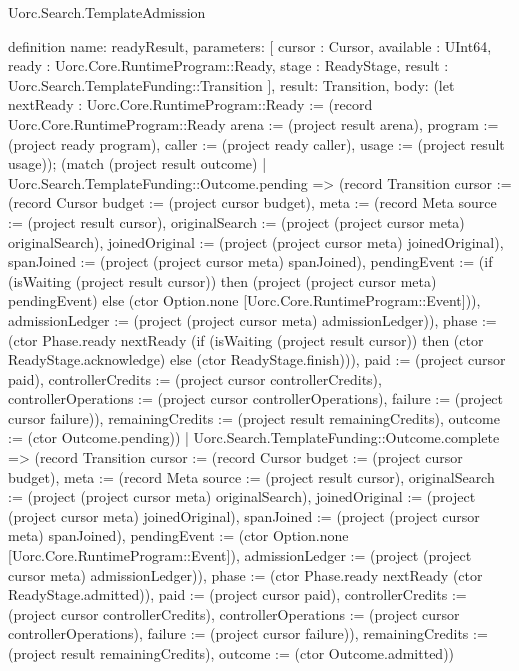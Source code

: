 \begin{lexlean}{Uorc.Search.TemplateAdmission}
\begin{semanticmodule}
definition{
  name: readyResult,
  parameters: [
    cursor : Cursor,
    available : UInt64,
    ready : Uorc.Core.RuntimeProgram::Ready,
    stage : ReadyStage,
    result : Uorc.Search.TemplateFunding::Transition
  ],
  result: Transition,
  body: (let nextReady : Uorc.Core.RuntimeProgram::Ready := (record Uorc.Core.RuntimeProgram::Ready {arena := (project result arena), program := (project ready program), caller := (project ready caller), usage := (project result usage)}); (match (project result outcome)
    | Uorc.Search.TemplateFunding::Outcome.pending => (record Transition {cursor := (record Cursor {budget := (project cursor budget), meta := (record Meta {source := (project result cursor), originalSearch := (project (project cursor meta) originalSearch), joinedOriginal := (project (project cursor meta) joinedOriginal), spanJoined := (project (project cursor meta) spanJoined), pendingEvent := (if (isWaiting (project result cursor)) then (project (project cursor meta) pendingEvent) else (ctor Option.none [Uorc.Core.RuntimeProgram::Event])), admissionLedger := (project (project cursor meta) admissionLedger)}), phase := (ctor Phase.ready nextReady (if (isWaiting (project result cursor)) then (ctor ReadyStage.acknowledge) else (ctor ReadyStage.finish))), paid := (project cursor paid), controllerCredits := (project cursor controllerCredits), controllerOperations := (project cursor controllerOperations), failure := (project cursor failure)}), remainingCredits := (project result remainingCredits), outcome := (ctor Outcome.pending)})
    | Uorc.Search.TemplateFunding::Outcome.complete => (record Transition {cursor := (record Cursor {budget := (project cursor budget), meta := (record Meta {source := (project result cursor), originalSearch := (project (project cursor meta) originalSearch), joinedOriginal := (project (project cursor meta) joinedOriginal), spanJoined := (project (project cursor meta) spanJoined), pendingEvent := (ctor Option.none [Uorc.Core.RuntimeProgram::Event]), admissionLedger := (project (project cursor meta) admissionLedger)}), phase := (ctor Phase.ready nextReady (ctor ReadyStage.admitted)), paid := (project cursor paid), controllerCredits := (project cursor controllerCredits), controllerOperations := (project cursor controllerOperations), failure := (project cursor failure)}), remainingCredits := (project result remainingCredits), outcome := (ctor Outcome.admitted)})
}
\end{semanticmodule}
\end{lexlean}
